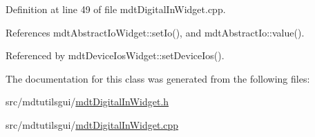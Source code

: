 Definition at line 49 of file mdt\-Digital\-In\-Widget.\-cpp.



References mdt\-Abstract\-Io\-Widget\-::set\-Io(), and mdt\-Abstract\-Io\-::value().



Referenced by mdt\-Device\-Ios\-Widget\-::set\-Device\-Ios().



The documentation for this class was generated from the following files\-:\begin{DoxyCompactItemize}
\item 
src/mdtutilsgui/\hyperlink{mdt_digital_in_widget_8h}{mdt\-Digital\-In\-Widget.\-h}\item 
src/mdtutilsgui/\hyperlink{mdt_digital_in_widget_8cpp}{mdt\-Digital\-In\-Widget.\-cpp}\end{DoxyCompactItemize}
